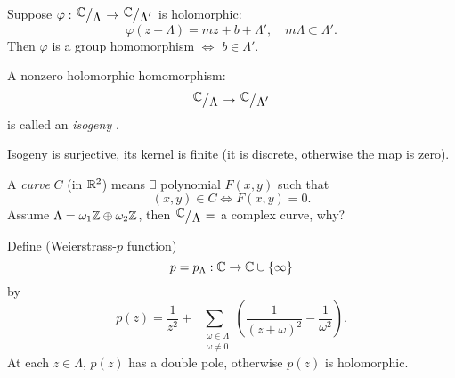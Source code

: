 \begin{corollary}
  Suppose $\varphi:\sfrac{\C}{\Lambda}\to \sfrac{\C}{\Lambda'}$ is holomorphic:
  \[
    \varphi(z+\Lambda)=mz+b+\Lambda', \quad m\Lambda\subset \Lambda'.
  \] 
  Then $\varphi$ is a group homomorphism $\Leftrightarrow$ $b\in \Lambda'$.
\end{corollary}

\begin{definition}
  A nonzero holomorphic homomorphism:
  \[
    \sfrac{\C}{\Lambda}\to \sfrac{\C}{\Lambda'}
  \] 
  is called an \textit{isogeny} .
\end{definition}
Isogeny is surjective, its kernel is finite (it is discrete, otherwise the map is zero).

  A  \textit{curve} $C$ (in $\mathbb{R}^2$) means $\exists$ polynomial $F(x,y)$ such that 
  \[
    (x,y)\in C\Leftrightarrow F(x,y)=0.
  \] 
  Assume $\Lambda=\omega_1\mathbb{Z}\oplus\omega_2\mathbb{Z}$, then $\sfrac{\C}{\Lambda}=$ a complex curve, why?

  Define (Weierstrass-$p$ function)
  \[
  p=p_{\Lambda}:\mathbb{C}\to \mathbb{C} \cup \{\infty\} 
  \] by 
  \[
    p(z)=\frac{1}{z^2}+\sum_{\begin{smallmatrix} &\omega \in \Lambda\\ &\omega\neq 0 \end{smallmatrix} }^{} \left( \frac{1}{\left( z+\omega \right) ^2}-\frac{1}{\omega^2} \right) .
  \] 
  At each $z\in \Lambda$, $p(z)$ has a double pole, otherwise $p(z)$ is holomorphic. 
  
